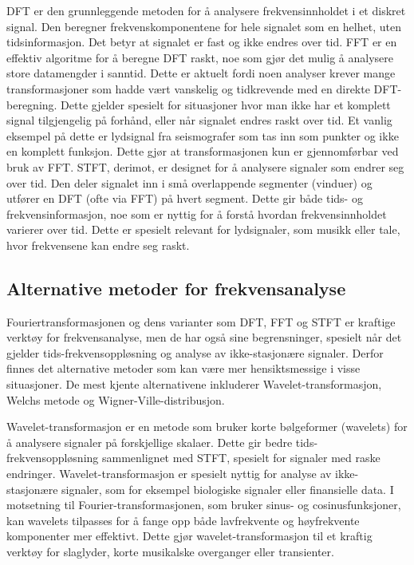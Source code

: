 DFT er den grunnleggende metoden for å analysere frekvensinnholdet i et diskret signal. Den beregner frekvenskomponentene for hele signalet som en helhet, uten
tidsinformasjon. Det betyr at signalet er fast og ikke endres over tid. FFT er en effektiv algoritme for å beregne DFT raskt, noe som gjør det mulig å analysere 
store datamengder i sanntid. Dette er aktuelt fordi noen analyser krever mange transformasjoner som hadde vært vanskelig og tidkrevende med en direkte DFT-beregning.
Dette gjelder spesielt for situasjoner hvor man ikke har et komplett signal tilgjengelig på forhånd, eller når signalet endres raskt over tid. Et vanlig eksempel på 
dette er lydsignal fra seismografer som tas inn som punkter og ikke en komplett funksjon. Dette gjør at transformasjonen kun er gjennomførbar ved bruk av FFT. 
STFT, derimot, er designet for å analysere signaler som endrer seg over tid. Den deler signalet inn i små overlappende segmenter (vinduer) og utfører en DFT 
(ofte via FFT) på hvert segment. Dette gir både tids- og frekvensinformasjon, noe som er nyttig for å forstå hvordan frekvensinnholdet varierer over tid. Dette
er spesielt relevant for lydsignaler, som musikk eller tale, hvor frekvensene kan endre seg raskt.


\subsection{Alternative metoder for frekvensanalyse}
Fouriertransformasjonen og dens varianter som DFT, FFT og STFT er kraftige verktøy for frekvensanalyse, men de har også sine begrensninger, spesielt når det gjelder 
tids-frekvensoppløsning og analyse av ikke-stasjonære signaler. Derfor finnes det alternative metoder som kan være mer hensiktsmessige i visse situasjoner.
De mest kjente alternativene inkluderer Wavelet-transformasjon, Welchs metode og Wigner-Ville-distribusjon.

Wavelet-transformasjon er en metode som bruker korte bølgeformer (wavelets) for å analysere signaler på forskjellige skalaer. Dette gir bedre tids-frekvensoppløsning
sammenlignet med STFT, spesielt for signaler med raske endringer. Wavelet-transformasjon er spesielt nyttig for analyse av ikke-stasjonære signaler, som for eksempel 
biologiske signaler eller finansielle data. I motsetning til Fourier-transformasjonen, som bruker sinus- og cosinusfunksjoner, kan wavelets tilpasses for å fange opp 
både lavfrekvente og høyfrekvente komponenter mer effektivt. Dette gjør wavelet-transformasjon til et kraftig verktøy for slaglyder, korte musikalske overganger eller 
transienter. \parencite{holden_wavelets}

